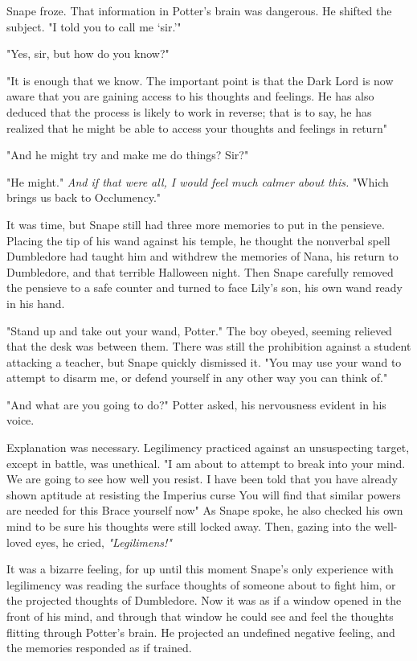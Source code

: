 Snape froze. That information in Potter's brain was dangerous. He shifted the subject. "I told you to call me `sir.'"

"Yes, sir, but how do you know{\el}?"

"It is enough that we know. The important point is that the Dark Lord is now aware that you are gaining access to his thoughts and feelings. He has also deduced that the process is likely to work in reverse; that is to say, he has realized that he might be able to access your thoughts and feelings in return{\el}"

"And he might try and make me do things? Sir?"

"He might." \emph{And if that were all, I would feel much calmer about this.} "Which brings us back to Occlumency."

It was time, but Snape still had three more memories to put in the pensieve. Placing the tip of his wand against his temple, he thought the nonverbal spell Dumbledore had taught him and withdrew the memories of Nana, his return to Dumbledore, and that terrible Halloween night. Then Snape carefully removed the pensieve to a safe counter and turned to face Lily's son, his own wand ready in his hand.

"Stand up and take out your wand, Potter." The boy obeyed, seeming relieved that the desk was between them. There was still the prohibition against a student attacking a teacher, but Snape quickly dismissed it. "You may use your wand to attempt to disarm me, or defend yourself in any other way you can think of."

"And what are you going to do?" Potter asked, his nervousness evident in his voice.

Explanation was necessary. Legilimency practiced against an unsuspecting target, except in battle, was unethical. "I am about to attempt to break into your mind. We are going to see how well you resist. I have been told that you have already shown aptitude at resisting the Imperius curse{\el} You will find that similar powers are needed for this{\el} Brace yourself now{\el}" As Snape spoke, he also checked his own mind to be sure his thoughts were still locked away. Then, gazing into the well-loved eyes, he cried, \emph{"Legilimens!"}

It was a bizarre feeling, for up until this moment Snape's only experience with legilimency was reading the surface thoughts of someone about to fight him, or the projected thoughts of Dumbledore. Now it was as if a window opened in the front of his mind, and through that window he could see and feel the thoughts flitting through Potter's brain. He projected an undefined negative feeling, and the memories responded as if trained.

